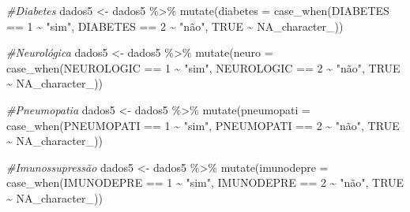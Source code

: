 \documentclass[
]{article}
\newenvironment{Shaded}{\begin{snugshade}}{\end{snugshade}}
\newcommand{\AttributeTok}[1]{\textcolor[rgb]{0.77,0.63,0.00}{#1}}
\newcommand{\CommentTok}[1]{\textcolor[rgb]{0.56,0.35,0.01}{\textit{#1}}}
\newcommand{\ConstantTok}[1]{\textcolor[rgb]{0.00,0.00,0.00}{#1}}
\newcommand{\DecValTok}[1]{\textcolor[rgb]{0.00,0.00,0.81}{#1}}
\newcommand{\FunctionTok}[1]{\textcolor[rgb]{0.00,0.00,0.00}{#1}}
\newcommand{\NormalTok}[1]{#1}
\newcommand{\OtherTok}[1]{\textcolor[rgb]{0.56,0.35,0.01}{#1}}
\newcommand{\SpecialCharTok}[1]{\textcolor[rgb]{0.00,0.00,0.00}{#1}}
\newcommand{\StringTok}[1]{\textcolor[rgb]{0.31,0.60,0.02}{#1}}
\begin{document}
\begin{Shaded}
\begin{Highlighting}[]
\CommentTok{\#Diabetes}
\NormalTok{dados5 }\OtherTok{\textless{}{-}}\NormalTok{  dados5 }\SpecialCharTok{\%\textgreater{}\%}
  \FunctionTok{mutate}\NormalTok{(}\AttributeTok{diabetes =} \FunctionTok{case\_when}\NormalTok{(DIABETES }\SpecialCharTok{==} \DecValTok{1} \SpecialCharTok{\textasciitilde{}} \StringTok{"sim"}\NormalTok{,}
\NormalTok{                              DIABETES }\SpecialCharTok{==} \DecValTok{2} \SpecialCharTok{\textasciitilde{}} \StringTok{"não"}\NormalTok{,}
                              \ConstantTok{TRUE} \SpecialCharTok{\textasciitilde{}} \ConstantTok{NA\_character\_}\NormalTok{))}

\CommentTok{\#Neurológica}
\NormalTok{dados5 }\OtherTok{\textless{}{-}}\NormalTok{  dados5 }\SpecialCharTok{\%\textgreater{}\%}
  \FunctionTok{mutate}\NormalTok{(}\AttributeTok{neuro =} \FunctionTok{case\_when}\NormalTok{(NEUROLOGIC }\SpecialCharTok{==} \DecValTok{1} \SpecialCharTok{\textasciitilde{}} \StringTok{"sim"}\NormalTok{,}
\NormalTok{                           NEUROLOGIC }\SpecialCharTok{==} \DecValTok{2} \SpecialCharTok{\textasciitilde{}} \StringTok{"não"}\NormalTok{,}
                           \ConstantTok{TRUE} \SpecialCharTok{\textasciitilde{}} \ConstantTok{NA\_character\_}\NormalTok{))}

\CommentTok{\#Pneumopatia}
\NormalTok{dados5 }\OtherTok{\textless{}{-}}\NormalTok{  dados5 }\SpecialCharTok{\%\textgreater{}\%}
  \FunctionTok{mutate}\NormalTok{(}\AttributeTok{pneumopati =} \FunctionTok{case\_when}\NormalTok{(PNEUMOPATI }\SpecialCharTok{==} \DecValTok{1} \SpecialCharTok{\textasciitilde{}} \StringTok{"sim"}\NormalTok{,}
\NormalTok{                                PNEUMOPATI }\SpecialCharTok{==} \DecValTok{2} \SpecialCharTok{\textasciitilde{}} \StringTok{"não"}\NormalTok{,}
                                \ConstantTok{TRUE} \SpecialCharTok{\textasciitilde{}} \ConstantTok{NA\_character\_}\NormalTok{))}

\CommentTok{\#Imunossupressão}
\NormalTok{dados5 }\OtherTok{\textless{}{-}}\NormalTok{  dados5 }\SpecialCharTok{\%\textgreater{}\%}
  \FunctionTok{mutate}\NormalTok{(}\AttributeTok{imunodepre =} \FunctionTok{case\_when}\NormalTok{(IMUNODEPRE }\SpecialCharTok{==} \DecValTok{1} \SpecialCharTok{\textasciitilde{}} \StringTok{"sim"}\NormalTok{,}
\NormalTok{                                IMUNODEPRE }\SpecialCharTok{==} \DecValTok{2} \SpecialCharTok{\textasciitilde{}} \StringTok{"não"}\NormalTok{,}
                                \ConstantTok{TRUE} \SpecialCharTok{\textasciitilde{}} \ConstantTok{NA\_character\_}\NormalTok{))}


\end{Highlighting}
\end{Shaded}
\end{document}
